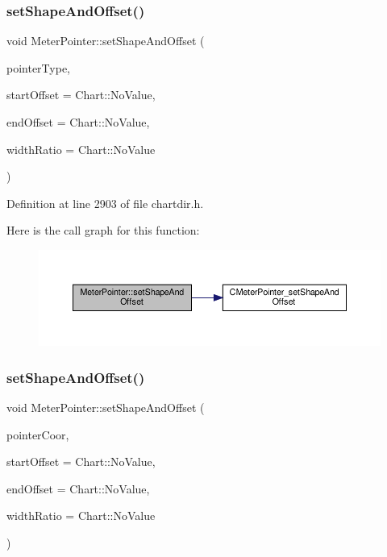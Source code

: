 \subsubsection{\texorpdfstring{set\+Shape\+And\+Offset()}{setShapeAndOffset()}\hspace{0.1cm}{\footnotesize\ttfamily [1/2]}}
{\footnotesize\ttfamily void Meter\+Pointer\+::set\+Shape\+And\+Offset (\begin{DoxyParamCaption}\item[{int}]{pointer\+Type,  }\item[{double}]{start\+Offset = {\ttfamily Chart\+:\+:NoValue},  }\item[{double}]{end\+Offset = {\ttfamily Chart\+:\+:NoValue},  }\item[{double}]{width\+Ratio = {\ttfamily Chart\+:\+:NoValue} }\end{DoxyParamCaption})\hspace{0.3cm}{\ttfamily [inline]}}



Definition at line 2903 of file chartdir.\+h.

Here is the call graph for this function\+:
\nopagebreak
\begin{figure}[H]
\begin{center}
\leavevmode
\includegraphics[width=350pt]{class_meter_pointer_abfea6d66197a40b67d984137034bb393_cgraph}
\end{center}
\end{figure}
\mbox{\label{class_meter_pointer_a1fe290c1ac81816a5a1d06673fb414d5}} 
\subsubsection{\texorpdfstring{set\+Shape\+And\+Offset()}{setShapeAndOffset()}\hspace{0.1cm}{\footnotesize\ttfamily [2/2]}}
{\footnotesize\ttfamily void Meter\+Pointer\+::set\+Shape\+And\+Offset (\begin{DoxyParamCaption}\item[{\hyperlink{class_int_array}{Int\+Array}}]{pointer\+Coor,  }\item[{double}]{start\+Offset = {\ttfamily Chart\+:\+:NoValue},  }\item[{double}]{end\+Offset = {\ttfamily Chart\+:\+:NoValue},  }\item[{double}]{width\+Ratio = {\ttfamily Chart\+:\+:NoValue} }\end{DoxyParamCaption})\hspace{0.3cm}{\ttfamily [inline]}}



